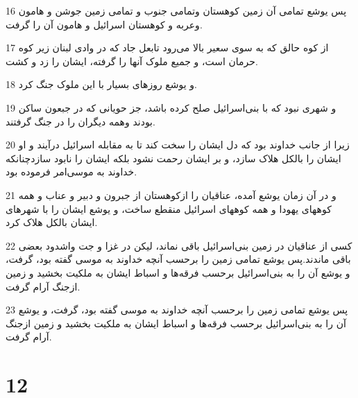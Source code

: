 \par 16 پس یوشع تمامی آن زمین کوهستان وتمامی جنوب و تمامی زمین جوشن و هامون وعربه و کوهستان اسرائیل و هامون آن را گرفت.
\par 17 از کوه حالق که به سوی سعیر بالا می‌رود تابعل جاد که در وادی لبنان زیر کوه حرمان است، و جمیع ملوک آنها را گرفته، ایشان را زد و کشت.
\par 18 و یوشع روزهای بسیار با این ملوک جنگ کرد.
\par 19 و شهری نبود که با بنی‌اسرائیل صلح کرده باشد، جز حویانی که در جبعون ساکن بودند وهمه دیگران را در جنگ گرفتند.
\par 20 زیرا از جانب خداوند بود که دل ایشان را سخت کند تا به مقابله اسرائیل درآیند و او ایشان را بالکل هلاک سازد، و بر ایشان رحمت نشود بلکه ایشان را نابود سازدچنانکه خداوند به موسی‌امر فرموده بود.
\par 21 و در آن زمان یوشع آمده، عناقیان را ازکوهستان از جبرون و دبیر و عناب و همه کوههای یهودا و همه کوههای اسرائیل منقطع ساخت، و یوشع ایشان را با شهرهای ایشان بالکل هلاک کرد.
\par 22 کسی از عناقیان در زمین بنی‌اسرائیل باقی نماند، لیکن در غزا و جت واشدود بعضی باقی ماندند.پس یوشع تمامی زمین را برحسب آنچه خداوند به موسی گفته بود، گرفت، و یوشع آن را به بنی‌اسرائیل برحسب فرقه‌ها و اسباط ایشان به ملکیت بخشید و زمین ازجنگ آرام گرفت.
\par 23 پس یوشع تمامی زمین را برحسب آنچه خداوند به موسی گفته بود، گرفت، و یوشع آن را به بنی‌اسرائیل برحسب فرقه‌ها و اسباط ایشان به ملکیت بخشید و زمین ازجنگ آرام گرفت.
 
\chapter{12}

